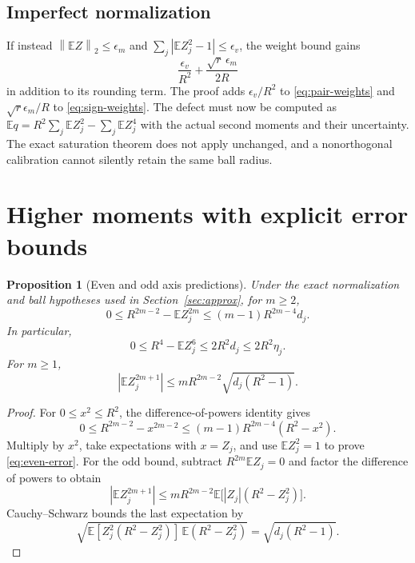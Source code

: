 \documentclass[11pt]{article}
\newtheorem{proposition}[theorem]{Proposition}
\theoremstyle{definition}
\theoremstyle{remark}
\newcommand{\E}{\mathbb E}
\newcommand{\norm}[1]{\left\lVert#1\right\rVert}
\newcommand{\abs}[1]{\left\lvert#1\right\rvert}
\begin{document}
\subsection{Imperfect normalization}

If instead
$\norm{\E Z}_2\le\epsilon_m$ and
$\sum_j|\E Z_j^2-1|\le\epsilon_v$, the weight bound gains
\begin{equation}
\frac{\epsilon_v}{R^2}+
\frac{\sqrt r\,\epsilon_m}{2R}
\label{eq:normalization-error}
\end{equation}
in addition to its rounding term. The proof adds $\epsilon_v/R^2$ to
\eqref{eq:pair-weights} and $\sqrt r\epsilon_m/R$ to
\eqref{eq:sign-weights}. The defect must now be computed as
$\E q=R^2\sum_j\E Z_j^2-\sum_j\E Z_j^4$ with the actual second moments
and their uncertainty. The exact saturation theorem does not apply
unchanged, and a nonorthogonal calibration cannot silently retain the
same ball radius.

\section{Higher moments with explicit error bounds}
\label{sec:higher-approx}

\begin{proposition}[Even and odd axis predictions]
\label{prop:higher}
Under the exact normalization and ball hypotheses used in
Section~\ref{sec:approx}, for $m\ge2$,
\begin{equation}
0\le R^{2m-2}-\E Z_j^{2m}
\le(m-1)R^{2m-4}d_j.
\label{eq:even-error}
\end{equation}
In particular,
\begin{equation}
0\le R^4-\E Z_j^6\le2R^2d_j\le2R^2\eta_j.
\label{eq:sixth-error}
\end{equation}
For $m\ge1$,
\begin{equation}
\abs{\E Z_j^{2m+1}}
\le mR^{2m-2}\sqrt{d_j(R^2-1)}.
\label{eq:odd-error}
\end{equation}
\end{proposition}
\begin{proof}
For $0\le x^2\le R^2$, the difference-of-powers identity gives
\[
0\le R^{2m-2}-x^{2m-2}
\le(m-1)R^{2m-4}(R^2-x^2).
\]
Multiply by $x^2$, take expectations with $x=Z_j$, and use
$\E Z_j^2=1$ to prove \eqref{eq:even-error}. For the odd bound, subtract
$R^{2m}\E Z_j=0$ and factor the difference of powers to obtain
\[
\abs{\E Z_j^{2m+1}}
\le mR^{2m-2}\E\bigl[|Z_j|(R^2-Z_j^2)\bigr].
\]
Cauchy--Schwarz bounds the last expectation by
\[
\sqrt{\E[Z_j^2(R^2-Z_j^2)]\,\E(R^2-Z_j^2)}
=\sqrt{d_j(R^2-1)}.
\]
\end{proof}
\end{document}
